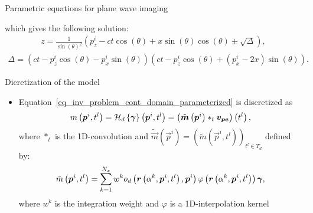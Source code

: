 {\begin{block}{Parametric equations for plane wave imaging}
\begin{itemize}
		which gives the following solution:
		\begin{align}
		z = \frac{1}{\sin \left(\theta\right)^2} \left(p^i_z - ct \cos \left(\theta\right) + x \sin \left(\theta\right) \cos \left(\theta\right) \pm \sqrt{\Delta} \right),
		\end{align}
		\begin{align*}
		\Delta = \left(ct-p^i_z \cos \left(\theta\right) - p^i_x \sin \left(\theta\right) \right)\left(ct-p^i_z \cos \left(\theta\right) + \left(p^i_x -2 x\right) \sin \left(\theta\right) \right).
		\end{align*}
	\end{itemize}
\end{block}
\begin{block}{Dicretization of the model}
	\begin{itemize}
		\item Equation~\eqref{eq_inv_problem_cont_domain_parameterized} is discretized as
		\begin{align}
		\label{eq_inv_problem_dist_domain_parameterized}
		m\left(\bm{p}^i, t^l\right) = \mathcal{H}_d \left\lbrace \bm{\gamma}\right\rbrace\left(\bm{p}^i, t^l\right) =  \left(\tilde{\bm{m}}\left(\bm{p}^i\right) \ast_t \bm{v_{pe}}\right) \left(t^l\right), 
		\end{align}
		where $\ast_t$ is the \num{1}D-convolution and $\tilde{\vec{m}}\left(\vec{p}^i\right) = \left(\tilde{m}\left(\vec{p}^i, t^l\right)\right)_{t^l \in T_d}$ defined by:
		\begin{align}
		\label{eq_m_tilde}
		\tilde{m}\left(\bm{p}^i, t^l\right) = \sum \limits_{k = 1}^{N_x} w^k o_d\left(\bm{r}\left(\alpha^k, \bm{p}^i, t^l\right), \bm{p}^i\right) \varphi \left(\bm{r}\left(\alpha^k, \bm{p}^i, t^l\right)\right) \bm{\gamma}, 
		\end{align}
		where $w^k$ is the integration weight and $\varphi$ is a \num{1}D-interpolation kernel
	\end{itemize}
\end{block}

}%